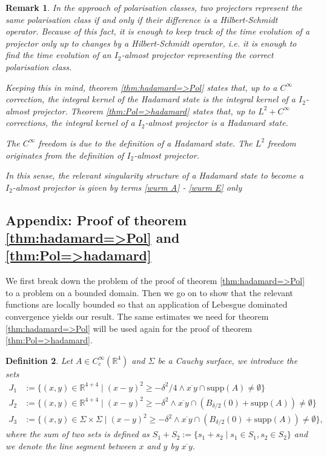 \documentclass[b5paper,draft,openbib,12pt]{memoir}
\newtheorem{Def}{Definition}
\newtheorem{Remark}[Def]{Remark}
\begin{document}
\begin{Remark}
In the approach of polarisation classes, two projectors represent the same polarisation class if and only if their difference is a Hilbert-Schmidt operator. 
Because of this fact, it is enough to keep track of the time evolution of a projector only up to changes by a Hilbert-Schmidt operator, i.e. it is enough
to find the time evolution of an \(I_2\)-almost projector representing the correct polarisation class. 

Keeping this in mind,
theorem \ref{thm:hadamard=>Pol} states that, up to a \(C^\infty\) correction, the integral kernel of the Hadamard state is the integral kernel of a \(I_2\)-almost projector.
Theorem \ref{thm:Pol=>hadamard} states that, up to \(L^2+C^\infty\) corrections, the integral kernel of a \(I_2\)-almost projector is a Hadamard state.

The \(C^\infty\) freedom is due to the definition of a Hadamard state. The \(L^2\) freedom originates from the definition of \(I_2\)-almost projector.

In this sense, the relevant singularity structure of a Hadamard state to become a \(I_2\)-almost projector is given by terms \eqref{wurm A} - \eqref{wurm E} only
\end{Remark}

\subsection{\!Appendix: Proof of theorem \ref{thm:hadamard=>Pol} and \ref{thm:Pol=>hadamard}}

We first break down the problem of the proof of theorem \ref{thm:hadamard=>Pol} to a problem on a bounded domain. Then we go on 
to show that the relevant functions are locally bounded so that an application of Lebesgue dominated convergence yields our result.
The same estimates we need for theorem \ref{thm:hadamard=>Pol} will be used again for the proof of theorem \ref{thm:Pol=>hadamard}.

\begin{Def} Let \(A\in C_c^\infty(\mathbb{R}^4)\) and \(\Sigma\) be a Cauchy surface, we introduce the sets
\begin{align}
J_1&:=\{(x,y)\in\mathbb{R}^{4+4}\mid (x-y)^2\ge -\delta^2/4 \wedge \overline{x~y} \cap \mathrm{supp}(A)\neq \emptyset\}\\
J_2&:=\{(x,y)\in\mathbb{R}^{4+4}\mid (x-y)^2\ge -\delta^2 \wedge \overline{x~y} \cap \left(B_{\delta/2}(0)+\mathrm{supp}(A)\right)\neq \emptyset\}\\
J_3&:=\{(x,y)\in \Sigma \times \Sigma \mid (x-y)^2 \ge-\delta^2\wedge \overline{x ~ y} \cap \left(B_{\delta/2}(0)+\mathrm{supp}(A) \right)\neq \emptyset \},
\end{align}
where the sum of two sets is defined as \(S_1+S_2:=\{s_1+s_2\mid s_1\in S_1, s_2\in S_2\}\) and we denote the line segment between \(x\) and \(y\) by \(\overline{x~y}\). 
\end{Def}
\end{document}
